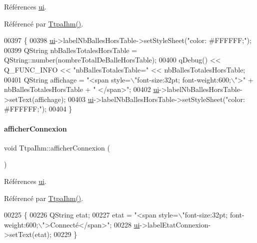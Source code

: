 Références \hyperlink{class_ttpa_ihm_ad5fae1222a667da158c26f3d0f0dce23}{ui}.



Référencé par \hyperlink{class_ttpa_ihm_ab3ed4b37a93ff04842414d4a98861d66}{Ttpa\+Ihm()}.


\begin{DoxyCode}
00397 \{    
00398     \hyperlink{class_ttpa_ihm_ad5fae1222a667da158c26f3d0f0dce23}{ui}->labelNbBallesHorsTable->setStyleSheet(\textcolor{stringliteral}{"color: #FFFFFF;"});
00399     QString nbBallesTotalesHorsTable = QString::number(nombreTotalDeBalleHorsTable);
00400     qDebug() << Q\_FUNC\_INFO << \textcolor{stringliteral}{"nbBallesTotalesTable="} << nbBallesTotalesHorsTable;
00401     QString affichage = \textcolor{stringliteral}{"<span style=\(\backslash\)"font-size:32pt; font-weight:600;\(\backslash\)">"} + nbBallesTotalesHorsTable + \textcolor{stringliteral}{"
      </span>"};
00402     \hyperlink{class_ttpa_ihm_ad5fae1222a667da158c26f3d0f0dce23}{ui}->labelNbBallesHorsTable->setText(affichage);
00403     \hyperlink{class_ttpa_ihm_ad5fae1222a667da158c26f3d0f0dce23}{ui}->labelNbBallesHorsTable->setStyleSheet(\textcolor{stringliteral}{"color: #FFFFFF;"});
00404 \}
\end{DoxyCode}
\mbox{\label{class_ttpa_ihm_a0ad70018b8aff04ef55a258dfc78ec04}} 
\paragraph{\texorpdfstring{afficher\+Connexion}{afficherConnexion}}
{\footnotesize\ttfamily void Ttpa\+Ihm\+::afficher\+Connexion (\begin{DoxyParamCaption}{ }\end{DoxyParamCaption})\hspace{0.3cm}{\ttfamily [slot]}}



Références \hyperlink{class_ttpa_ihm_ad5fae1222a667da158c26f3d0f0dce23}{ui}.



Référencé par \hyperlink{class_ttpa_ihm_ab3ed4b37a93ff04842414d4a98861d66}{Ttpa\+Ihm()}.


\begin{DoxyCode}
00225 \{
00226     QString etat;
00227     etat = \textcolor{stringliteral}{"<span style=\(\backslash\)"font-size:32pt; font-weight:600;\(\backslash\)">Connecté</span>"};
00228     \hyperlink{class_ttpa_ihm_ad5fae1222a667da158c26f3d0f0dce23}{ui}->labelEtatConnexion->setText(etat);
00229 \}
\end{DoxyCode}
\mbox{\label{class_ttpa_ihm_a266897eb263e584b40fc2b7c26347623}} 
